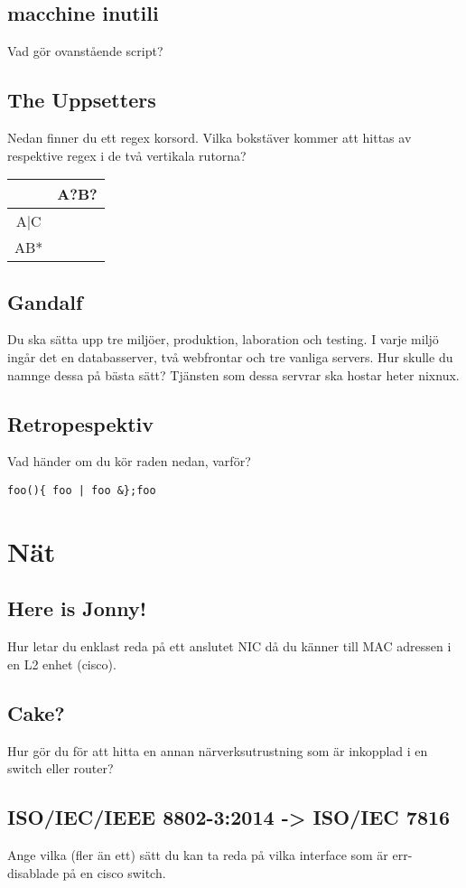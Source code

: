 \documentclass[a4paper]{report}
\begin{document}
\section{macchine inutili}
Vad gör ovanstående script?

\section{The Uppsetters}
Nedan finner du ett regex korsord. Vilka bokstäver kommer att hittas av respektive regex i de två vertikala rutorna?
\newline
\begin{tabular}{| c | c |}
\hline
& A?B? \\ \hline
A|C & \\ \hline
AB* & \\ \hline
\end{tabular}

\section{Gandalf}
Du ska sätta upp tre miljöer, produktion, laboration och testing. I varje miljö ingår det en databasserver, två webfrontar och tre vanliga servers. 
Hur skulle du namnge dessa på bästa sätt?
Tjänsten som dessa servrar ska hostar heter nixnux.

\section{Retropespektiv}
Vad händer om du kör raden nedan, varför? 
\begin{verbatim}
foo(){ foo | foo &};foo
\end{verbatim}
\chapter{Nät}
\section{Here is Jonny!}
Hur letar du enklast reda på ett anslutet NIC då du känner till MAC adressen i en L2 enhet (cisco).

\section{Cake?}
Hur gör du för att hitta en annan närverksutrustning som är inkopplad i en switch eller router?

\section{ISO/IEC/IEEE 8802-3:2014 -> ISO/IEC 7816}
Ange vilka (fler än ett) sätt du kan ta reda på vilka interface som är err-disablade på en cisco switch.
\end{document}
